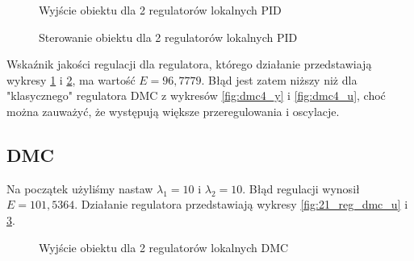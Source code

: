 \begin{figure}[H]
\centering
{}
\caption{Wyjście obiektu dla 2 regulatorów lokalnych PID}
\label{fig:2_reg_pid_y}
\end{figure}

\begin{figure}[H]
\centering
{}
\caption{Sterowanie obiektu dla 2 regulatorów lokalnych PID}
\label{fig:2_reg_pid_u}
\end{figure}

Wskaźnik jakości regulacji dla regulatora, którego działanie przedstawiają wykresy \ref{fig:2_reg_pid_y} i \ref{fig:2_reg_pid_u}, ma wartość $E=96,7779$. Błąd jest zatem niższy niż dla "klasycznego" regulatora DMC z wykresów \ref{fig:dmc4_y} i \ref{fig:dmc4_u}, choć można zauważyć, że występują większe przeregulowania i oscylacje.

\subsection{DMC}
Na początek użyliśmy nastaw $\lambda_1=10$ i $\lambda_2=10$. Błąd regulacji wynosił $E=101,5364$. Działanie regulatora przedstawiają wykresy \ref{fig:21_reg_dmc_u} i \ref{fig:21_reg_dmc_y}.

\begin{figure}[H]
\centering
{}
\caption{Wyjście obiektu dla 2 regulatorów lokalnych DMC}
\label{fig:21_reg_dmc_y}
\end{figure}

